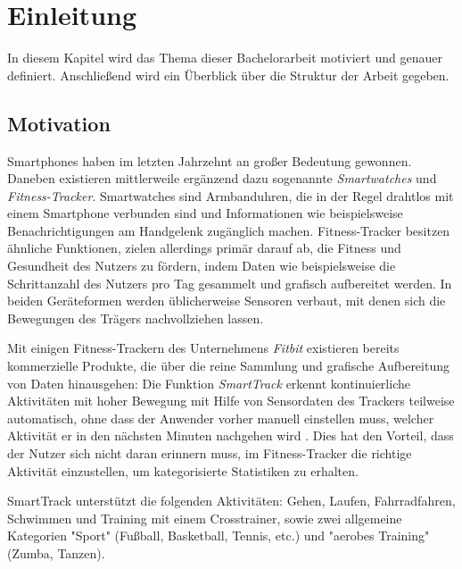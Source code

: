 \chapter{Einleitung}
\label{chap:introduction}

In diesem Kapitel wird das Thema dieser Bachelorarbeit motiviert und genauer definiert. Anschließend wird ein Überblick über die Struktur der Arbeit gegeben.
\section{Motivation}
Smartphones haben im letzten Jahrzehnt an großer Bedeutung gewonnen. Daneben existieren mittlerweile ergänzend dazu sogenannte \textit{Smartwatches} und \textit{Fitness-Tracker}. Smartwatches sind Armbanduhren, die in der Regel drahtlos mit einem Smartphone verbunden sind und Informationen wie beispielsweise Benachrichtigungen am Handgelenk zugänglich machen. Fitness-Tracker besitzen ähnliche Funktionen, zielen allerdings primär darauf ab, die Fitness und Gesundheit des Nutzers zu fördern, indem Daten wie beispielsweise die Schrittanzahl des Nutzers pro Tag gesammelt und grafisch aufbereitet werden. In beiden Geräteformen werden üblicherweise Sensoren verbaut, mit denen sich die Bewegungen des Trägers nachvollziehen lassen.

Mit einigen Fitness-Trackern des Unternehmens \textit{Fitbit} existieren bereits kommerzielle Produkte, die über die reine Sammlung und grafische Aufbereitung von Daten hinausgehen: Die Funktion \textit{SmartTrack} erkennt kontinuierliche Aktivitäten mit hoher Bewegung mit Hilfe von Sensordaten des Trackers teilweise automatisch, ohne dass der Anwender vorher manuell einstellen muss, welcher Aktivität er in den nächsten Minuten nachgehen wird \cite{FitbitSmartTrack}. Dies hat den Vorteil, dass der Nutzer sich nicht daran erinnern muss, im Fitness-Tracker die richtige Aktivität einzustellen, um kategorisierte Statistiken zu erhalten.

SmartTrack unterstützt die folgenden Aktivitäten: Gehen, Laufen, Fahrradfahren, Schwimmen und Training mit einem Crosstrainer, sowie zwei allgemeine Kategorien "Sport" (Fußball, Basketball, Tennis, etc.) und "aerobes Training" (Zumba, Tanzen).

